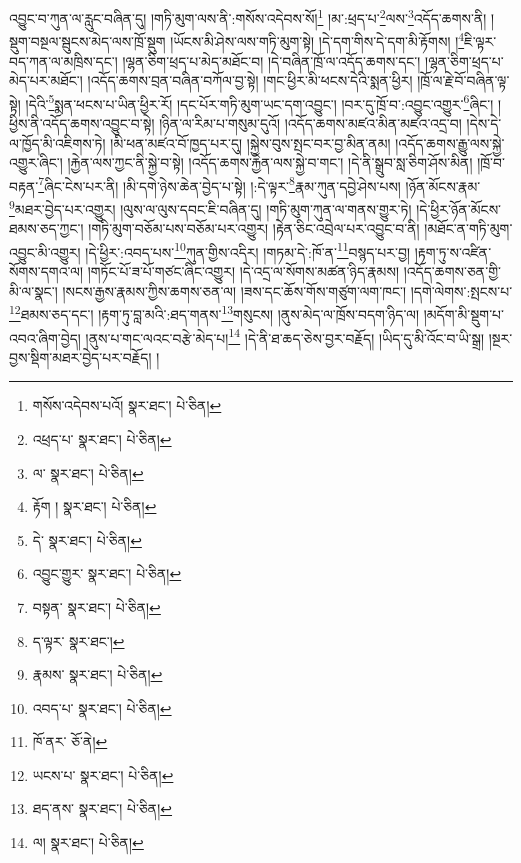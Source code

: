 འབྱུང་བ་ཀུན་ལ་རླུང་བཞིན་དུ། །གཏི་མུག་ལས་ནི་:གསོས་འདེབས་སོ།\footnote{གསོས་འདེབས་པའོ།  སྣར་ཐང་།  པེ་ཅིན། } །མ་:ཕྲད་པ་\footnote{འཕྲད་པ་  སྣར་ཐང་།  པེ་ཅིན། }ལས་\footnote{ལ་  སྣར་ཐང་།  པེ་ཅིན། }འདོད་ཆགས་ནི། །སྡུག་བསྔལ་སྦུངས་མེད་ལས་ཁྲོ་སྡུག །ཡོངས་མི་ཤེས་ལས་གཏི་མུག་སྟེ། །དེ་དག་གིས་དེ་དག་མི་རྟོགས། །\footnote{རྟོག །  སྣར་ཐང་།  པེ་ཅིན། }ཇི་ལྟར་བད་ཀན་ལ་མཁྲིས་དང་། །ལྷན་ཅིག་ཕྲད་པ་མེད་མཐོང་བ། །དེ་བཞིན་ཁྲོ་ལ་འདོད་ཆགས་དང་། །ལྷན་ཅིག་ཕྲད་པ་མེད་པར་མཐོང་། །འདོད་ཆགས་བྲན་བཞིན་བཀོལ་བྱ་སྟེ། །གང་ཕྱིར་མི་ཕངས་དེའི་སྨན་ཕྱིར། །ཁྲོ་ལ་རྗེ་བོ་བཞིན་ལྟ་སྟེ། །དེའི་\footnote{དེ་  སྣར་ཐང་།  པེ་ཅིན། }སྨན་ཕངས་པ་ཡིན་ཕྱིར་རོ། །དང་པོར་གཏི་མུག་ཡང་དག་འབྱུང་། །བར་དུ་ཁྲོ་བ་:འབྱུང་འགྱུར་\footnote{འབྱུང་གྱུར་  སྣར་ཐང་།  པེ་ཅིན། }ཞིང་། །ཕྱིས་ནི་འདོད་ཆགས་འབྱུང་བ་སྟེ། །ཉིན་ལ་རིམ་པ་གསུམ་དུའོ། །འདོད་ཆགས་མཛའ་མིན་མཛའ་འདྲ་བ། །དེས་དེ་ལ་ཁྱོད་མི་འཇིགས་ཏེ། །མི་ཕན་མཛའ་བོ་ཁྱད་པར་དུ། །སྐྱེས་བུས་སྤང་བར་བྱ་མིན་ནམ། །འདོད་ཆགས་རྒྱུ་ལས་སྐྱེ་འགྱུར་ཞིང་། །རྐྱེན་ལས་ཀྱང་ནི་སྐྱེ་བ་སྟེ། །འདོད་ཆགས་རྐྱེན་ལས་སྐྱེ་བ་གང་། །དེ་ནི་སྒྲུབ་སླ་ཅིག་ཤོས་མིན། །ཁྲོ་བ་བརྟན་\footnote{བསྟན་  སྣར་ཐང་།  པེ་ཅིན། }ཞིང་ངེས་པར་ནི། །མི་དགེ་ཉེས་ཆེན་བྱེད་པ་སྟེ། །:དེ་ལྟར་\footnote{ད་ལྟར་  སྣར་ཐང་། }རྣམ་ཀུན་དབྱེ་ཤེས་པས། །ཉོན་མོངས་རྣམ་\footnote{རྣམས་  སྣར་ཐང་།  པེ་ཅིན། }མཐར་བྱེད་པར་འགྱུར། །ལུས་ལ་ལུས་དབང་ཇི་བཞིན་དུ། །གཏི་མུག་ཀུན་ལ་གནས་གྱུར་ཏེ། །དེ་ཕྱིར་ཉོན་མོངས་ཐམས་ཅད་ཀྱང་། །གཏི་མུག་བཅོམ་པས་བཅོམ་པར་འགྱུར། །རྟེན་ཅིང་འབྲེལ་པར་འབྱུང་བ་ནི། །མཐོང་ན་གཏི་མུག་འབྱུང་མི་འགྱུར། །དེ་ཕྱིར་:འབད་པས་\footnote{འབད་པ་  སྣར་ཐང་།  པེ་ཅིན། }ཀུན་གྱིས་འདིར། །གཏམ་དེ་:ཁོ་ན་\footnote{ཁོ་ནར་  ཅོ་ནེ། }བསྙད་པར་བྱ། །རྟག་ཏུ་ས་འཛིན་སོགས་དགའ་ལ། །གཏོང་པོ་ཟ་པོ་གཙང་ཞིང་འགྱུར། །དེ་འདྲ་ལ་སོགས་མཚན་ཉིད་རྣམས། །འདོད་ཆགས་ཅན་གྱི་མི་ལ་སྣང་། །སངས་རྒྱས་རྣམས་ཀྱིས་ཆགས་ཅན་ལ། །ཟས་དང་ཆོས་གོས་གཙུག་ལག་ཁང་། །དགེ་ལེགས་:སྤངས་པ་\footnote{ཡངས་པ་  སྣར་ཐང་།  པེ་ཅིན། }ཐམས་ཅད་དང་། །རྟག་ཏུ་བླ་མའི་:ཐད་གནས་\footnote{ཐད་ནས་  སྣར་ཐང་།  པེ་ཅིན། }གསུངས། །ནུས་མེད་ལ་ཁྲོས་བདག་ཉིད་ལ། །མདོག་མི་སྡུག་པ་འབའ་ཞིག་བྱེད། །ནུས་པ་གང་ལའང་བརྩེ་མེད་པ།\footnote{ལ།  སྣར་ཐང་།  པེ་ཅིན། } །དེ་ནི་ཐ་ཆད་ཅེས་བྱར་བརྗོད། །ཡིད་དུ་མི་འོང་བ་ཡི་སྒྲ། །སྔར་བྱས་སྡིག་མཐར་བྱེད་པར་བརྗོད། །
